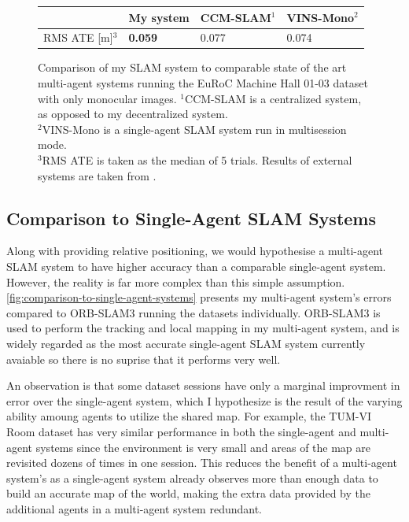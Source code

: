 \begin{figure}[h]
    \centering
    \def\arraystretch{1.2}
    \begin{tabular}{ |l|l|l|l| }
        \cline{2-4}
        \multicolumn{1}{c|}{} & My system      & CCM-SLAM$^1$ & VINS-Mono$^2$ \\
        \hline
        RMS ATE [m]$^3$       & \textbf{0.059} & 0.077        & 0.074         \\
        \hline
    \end{tabular}

    \caption{Comparison of my SLAM system to comparable state of the art multi-agent systems running the EuRoC Machine Hall 01-03 dataset with only monocular images. \captionbreak $^1$CCM-SLAM is a centralized system, as opposed to my decentralized system. \\ $^2$VINS-Mono is a single-agent SLAM system run in multisession mode. \\ $^3$RMS ATE is taken as the median of 5 trials. Results of external systems are taken from \autocite{schmuck2019ccm}.}
    \label{fig:comparison-to-multi-agent-systems}
\end{figure}

\subsection{Comparison to Single-Agent SLAM Systems}
Along with providing relative positioning, we would hypothesise a multi-agent SLAM system to have higher accuracy than a comparable single-agent system. However, the reality is far more complex than this simple assumption. \autoref{fig:comparison-to-single-agent-systems} presents my multi-agent system's errors compared to ORB-SLAM3 running the datasets individually. ORB-SLAM3 is used to perform the tracking and local mapping in my multi-agent system, and is widely regarded as the most accurate single-agent SLAM system currently avaiable so there is no suprise that it performs very well.

An observation is that some dataset sessions have only a marginal improvment in error over the single-agent system, which I hypothesize is the result of the varying ability amoung agents to utilize the shared map. For example, the TUM-VI Room dataset has very similar performance in both the single-agent and multi-agent systems since the environment is very small and areas of the map are revisited dozens of times in one session. This reduces the benefit of a multi-agent system's as a single-agent system already observes more than enough data to build an accurate map of the world, making the extra data provided by the additional agents in a multi-agent system redundant.

